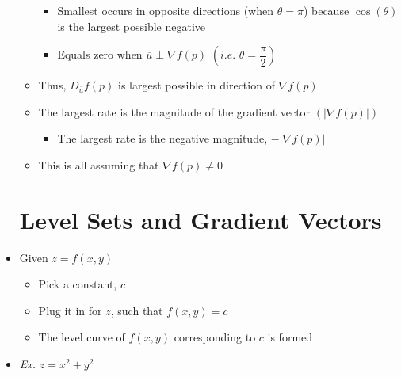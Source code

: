 \begin{itemize}
\begin{itemize}
        \begin{itemize}

          \item Smallest occurs in opposite directions (when $\theta = \pi$) because $\cos(\theta)$ is the largest possible negative

          \item Equals zero when $\overline{u} \perp \nabla f(p)$ $\left(\textit{i.e. } \theta = \dfrac{\pi}{2}\right)$

        \end{itemize}

      \item Thus, $D_{\overline{u}}f(p)$ is largest possible in direction of $\nabla f(p)$

      \item The largest rate is the magnitude of the gradient vector $\left(|\nabla f(p)|\right)$

        \begin{itemize}

          \item The largest rate is the negative magnitude, $-|\nabla f(p)|$

        \end{itemize}

      \item This is all assuming that $\nabla f(p) \neq 0$

    \end{itemize}

    \section{Level Sets and Gradient Vectors}

  \item Given $z=f(x,y)$

    \begin{itemize}

      \item Pick a constant, $c$

      \item Plug it in for $z$, such that $f(x,y)=c$

      \item The level curve of $f(x,y)$ corresponding to $c$ is formed

    \end{itemize}

  \item \textit{Ex.} $z=x^2+y^2$


\end{itemize}
